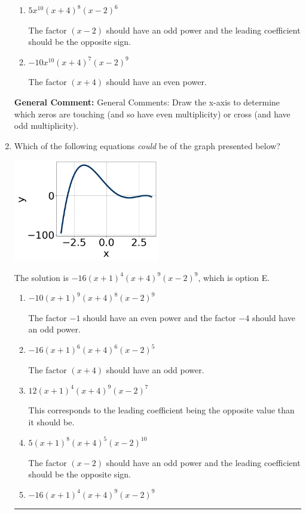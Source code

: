 \documentclass{extbook}[14pt]
\newcommand{\litem}[1]{\item #1

\rule{\textwidth}{0.4pt}}
\begin{document}
\begin{enumerate}
{\begin{enumerate}[label=\Alph*.]
The factor $(x + 4)$ should have an even power and the factor $(x - 2)$ should have an odd power.
\item \( 5x^{10} (x + 4)^{8} (x - 2)^{6} \)

The factor $(x - 2)$ should have an odd power and the leading coefficient should be the opposite sign.
\item \( -10x^{10} (x + 4)^{7} (x - 2)^{9} \)

The factor $(x + 4)$ should have an even power.
\end{enumerate}

\textbf{General Comment:} General Comments: Draw the x-axis to determine which zeros are touching (and so have even multiplicity) or cross (and have odd multiplicity).
}
\litem{
Which of the following equations \textit{could} be of the graph presented below?

\begin{center}
    \includegraphics[width=0.5\textwidth]{../Figures/polyGraphToFunctionC.png}
\end{center}



The solution is \( -16(x + 1)^{4} (x + 4)^{9} (x - 2)^{9} \), which is option E.\begin{enumerate}[label=\Alph*.]
\item \( -10(x + 1)^{9} (x + 4)^{8} (x - 2)^{9} \)

The factor $-1$ should have an even power and the factor $-4$ should have an odd power.
\item \( -16(x + 1)^{6} (x + 4)^{6} (x - 2)^{5} \)

The factor $(x + 4)$ should have an odd power.
\item \( 12(x + 1)^{4} (x + 4)^{9} (x - 2)^{7} \)

This corresponds to the leading coefficient being the opposite value than it should be.
\item \( 5(x + 1)^{8} (x + 4)^{5} (x - 2)^{10} \)

The factor $(x - 2)$ should have an odd power and the leading coefficient should be the opposite sign.
\item \( -16(x + 1)^{4} (x + 4)^{9} (x - 2)^{9} \)


\end{enumerate}}
\end{enumerate}
\end{document}
